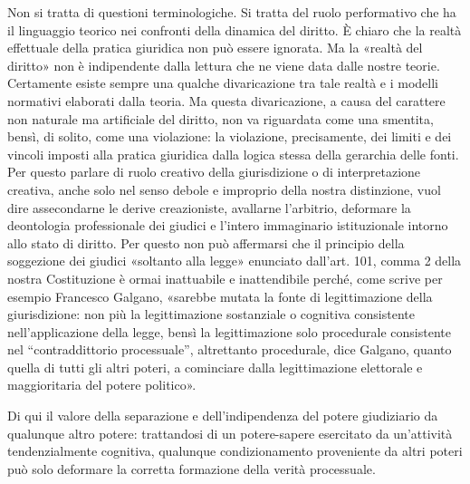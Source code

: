 Non si tratta di questioni terminologiche. Si tratta del ruolo performativo che ha il linguaggio teorico nei confronti della dinamica del diritto. È chiaro che la realtà effettuale della pratica giuridica non può essere ignorata. Ma la «realtà del diritto» non è indipendente dalla lettura che ne viene data dalle nostre teorie. Certamente esiste sempre una qualche divaricazione tra tale realtà e i modelli normativi elaborati dalla teoria. Ma questa divaricazione, a causa del carattere non naturale ma artificiale del diritto, non va riguardata come una smentita, bensì, di solito, come una violazione: la violazione, precisamente, dei limiti e dei vincoli imposti alla pratica giuridica dalla logica stessa della gerarchia delle fonti. Per questo parlare di ruolo creativo della giurisdizione o di interpretazione creativa, anche solo nel senso debole e improprio della nostra distinzione, vuol dire assecondarne le derive creazioniste, avallarne l’arbitrio, deformare la deontologia professionale dei giudici e l’intero immaginario istituzionale intorno allo stato di diritto. 
Per questo non può affermarsi che il principio della soggezione dei giudici «soltanto alla legge» enunciato dall’art. 101, comma 2 della nostra Costituzione è ormai inattuabile e inattendibile perché, come scrive per esempio Francesco Galgano, «sarebbe mutata la fonte di legittimazione della giurisdizione: non più la legittimazione sostanziale o cognitiva consistente nell’applicazione della legge, bensì la legittimazione solo procedurale consistente nel “contraddittorio processuale”, altrettanto procedurale, dice Galgano, quanto quella di tutti gli altri poteri, a cominciare dalla legittimazione elettorale e maggioritaria del potere politico». 

Di qui il valore della separazione e dell’indipendenza del potere giudiziario da qualunque altro potere: trattandosi di un potere-sapere esercitato da un’attività tendenzialmente cognitiva, qualunque condizionamento proveniente da altri poteri può solo deformare la corretta formazione della verità processuale.

